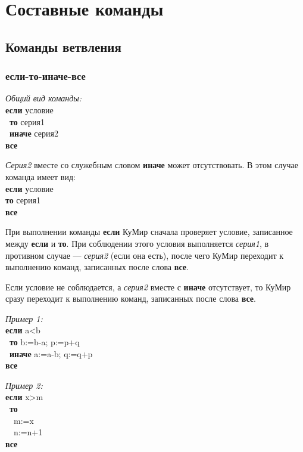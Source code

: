 \documentclass[12pt,a4paper]{article}
\newcommand{\otstup}{\textperiodcentered\ }
\begin{document}
\section{Составные команды}

\subsection{Команды ветвления}

\subsubsection{если-то-иначе-все}

\emph{Общий вид команды:}\\
{\sffamily
\textbf{если} условие\\
\otstup \textbf{то} серия1\\
\otstup \textbf{иначе} серия2\\
\textbf{все}
}

\emph{Серия2} вместе со служебным словом \textbf{иначе} может отсутствовать. В этом случае команда имеет вид:\\
{\sffamily
\textbf{если} условие\\
\textbf{то} серия1\\
\textbf{все} 
}

При выполнении команды \textbf{если} КуМир сначала проверяет условие, записанное между \textbf{если} и \textbf{то}. При соблюдении этого условия выполняется \emph{серия1}, в противном случае --- \emph{серия2} (если она есть), после чего КуМир переходит к выполнению команд, записанных после слова \textbf{все}.

Если условие не соблюдается, а \emph{серия2} вместе с \textbf{иначе} отсутствует, то КуМир сразу переходит к выполнению команд, записанных после слова \textbf{все}.

\emph{Пример 1:}\\
{\sffamily
\textbf{если} a<b\\
\otstup \textbf{то} b:=b-a; p:=p+q\\
\otstup \textbf{иначе} a:=a-b; q:=q+p\\
\textbf{все}
}

\emph{Пример 2:}\\
{\sffamily
\textbf{если} x>m\\
\otstup \textbf{то}\\
\otstup \otstup m:=x\\
\otstup \otstup n:=n+1\\
\textbf{все}
}
\end{document}
